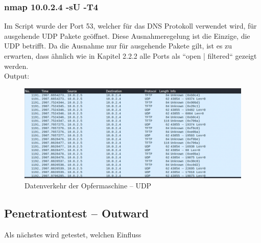 \subsubsection{nmap 10.0.2.4 -sU -T4}
Im Script wurde der Port 53, welcher für das DNS Protokoll verwendet wird, für ausgehende UDP Pakete geöffnet. Diese Ausnahmeregelung ist die Einzige, die UDP betrifft. Da die Ausnahme nur für ausgehende Pakete gilt, ist es zu erwarten, dass ähnlich wie in Kapitel 2.2.2 alle Ports als ``open | filtered`` gezeigt werden. \\
Output: 


\begin{figure}
	\includegraphics[width=\linewidth]{img/ws_firewall_standard_udp.png}
	\caption{Datenverkehr der Opfermaschine – UDP}
	\label{fig:ws_firewall_standard_udp}
\end{figure}
\subsection{Penetrationtest – Outward}

Als nächstes wird getestet, welchen Einfluss

